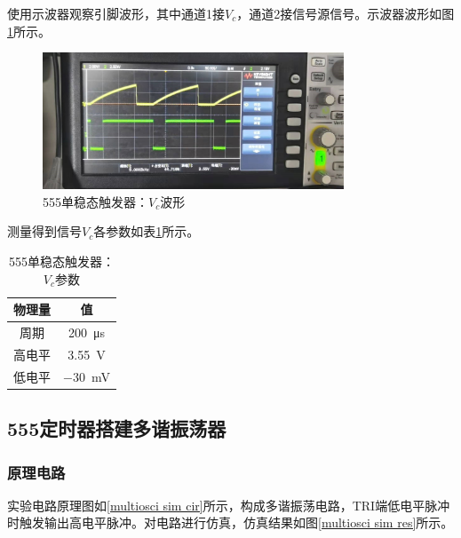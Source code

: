 \documentclass[UTF8]{ctexart}
\numberwithin{figure}{subsection}
\numberwithin{table}{subsection}
\numberwithin{equation}{subsection}
\begin{document}
\par 使用示波器观察引脚波形，其中通道1接\(V_c\)，通道2接信号源信号。示波器波形如图\ref{monostable vc osci}所示。

\begin{figure}[H]
    \begin{center}
        \includegraphics[width=0.8\textwidth]{555/monostable/vc.jpg}
    \end{center}
    \caption{555单稳态触发器：\(V_c\)波形}
    \label{monostable vc osci}
\end{figure}

测量得到信号\(V_c\)各参数如表\ref{monostable vc table}所示。

\begin{table}
    \begin{center}
        \begin{tabular}{c | c}
            物理量 & 值 \\
            \hline
            周期 & \SI{200}{\micro\second} \\
            高电平 & \SI{3.55}{\volt} \\
            低电平 & \SI{-30}{\milli\volt} \\
        \end{tabular}
        \label{monostable vc table}
        \caption{555单稳态触发器：\(V_c\)参数}
    \end{center}
\end{table}



\subsection{555定时器搭建多谐振荡器}
\subsubsection{原理电路}
\par 实验电路原理图如\ref{multiosci sim cir}所示，构成多谐振荡电路，TRI端低电平脉冲时触发输出高电平脉冲。对电路进行仿真，仿真结果如图\ref{multiosci sim res}所示。
\end{document}
